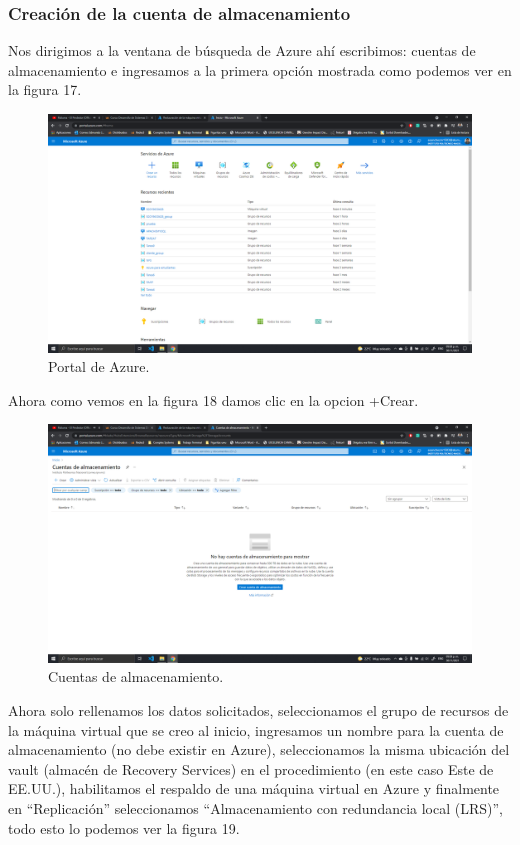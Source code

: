\documentclass[11pt]{article}
\begin{document}
			\subsubsection{Creación de la cuenta de almacenamiento }
			Nos dirigimos a la ventana de búsqueda de Azure ahí escribimos: cuentas de almacenamiento e ingresamos a la primera opción mostrada como podemos ver en la figura 17.
				\begin{figure}[H]
					\centering
					\includegraphics[scale=0.34]{resources/almacenamiento0.png}
					\caption{Portal de Azure.}\label{fig:picture}
				\end{figure}
			Ahora como vemos en la figura 18 damos clic en la opcion +Crear.
				\begin{figure}[H]
					\centering
					\includegraphics[scale=0.34]{resources/almacenamiento1.png}
					\caption{Cuentas de almacenamiento.}\label{fig:picture}
				\end{figure}
			Ahora solo rellenamos los datos solicitados, seleccionamos el grupo de recursos de la máquina virtual que se creo al inicio, ingresamos un nombre para la cuenta de almacenamiento (no debe existir en Azure), seleccionamos la misma ubicación del vault (almacén de Recovery Services) en el procedimiento (en este caso Este de EE.UU.), habilitamos el respaldo de una máquina virtual en Azure y finalmente en ``Replicación'' seleccionamos ``Almacenamiento con redundancia local (LRS)'', todo esto lo podemos ver la figura 19.
\end{document}
